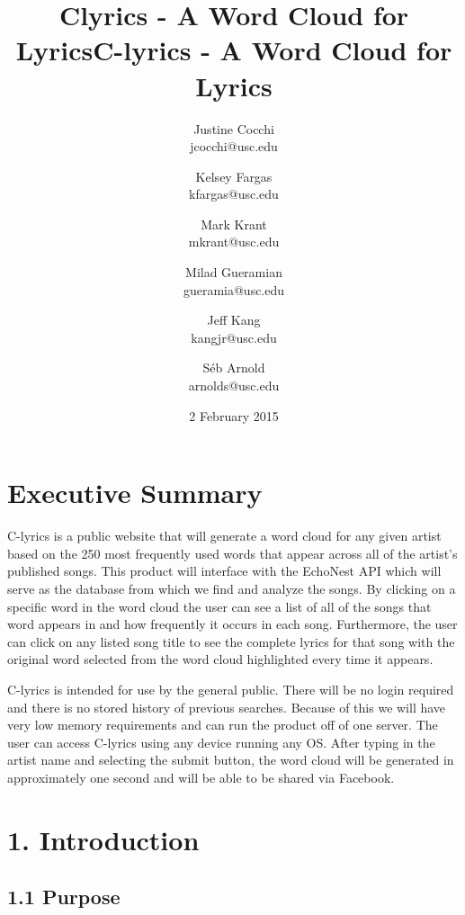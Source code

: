 \documentclass[]{article}
\title{Clyrics - A Word Cloud for Lyrics}
\author{Justine Cocchi\\jcocchi@usc.edu \and Kelsey Fargas\\kfargas@usc.edu \and Mark Krant \\ mkrant@usc.edu\and Milad Gueramian\\gueramia@usc.edu \and Jeff Kang\\kangjr@usc.edu \and Séb Arnold\\arnolds@usc.edu}
\date{2 February 2015}
\title{C-lyrics - A Word Cloud for Lyrics}
\begin{document}
\maketitle

\pagebreak

\tableofcontents
\setcounter{tocdepth}{4}

\pagebreak

\section{Executive Summary}\label{executive-summary}

C-lyrics is a public website that will generate a word cloud for any
given artist based on the 250 most frequently used words that appear
across all of the artist's published songs. This product will interface
with the EchoNest API which will serve as the database from which we
find and analyze the songs. By clicking on a specific word in the word
cloud the user can see a list of all of the songs that word appears in
and how frequently it occurs in each song. Furthermore, the user can
click on any listed song title to see the complete lyrics for that song
with the original word selected from the word cloud highlighted every
time it appears.

C-lyrics is intended for use by the general public. There will be no
login required and there is no stored history of previous searches.
Because of this we will have very low memory requirements and can run
the product off of one server. The user can access C-lyrics using any
device running any OS. After typing in the artist name and selecting the
submit button, the word cloud will be generated in approximately one
second and will be able to be shared via Facebook.

\pagebreak

\section{1. Introduction}\label{introduction}

\subsection{1.1 Purpose}\label{purpose}
\end{document}
